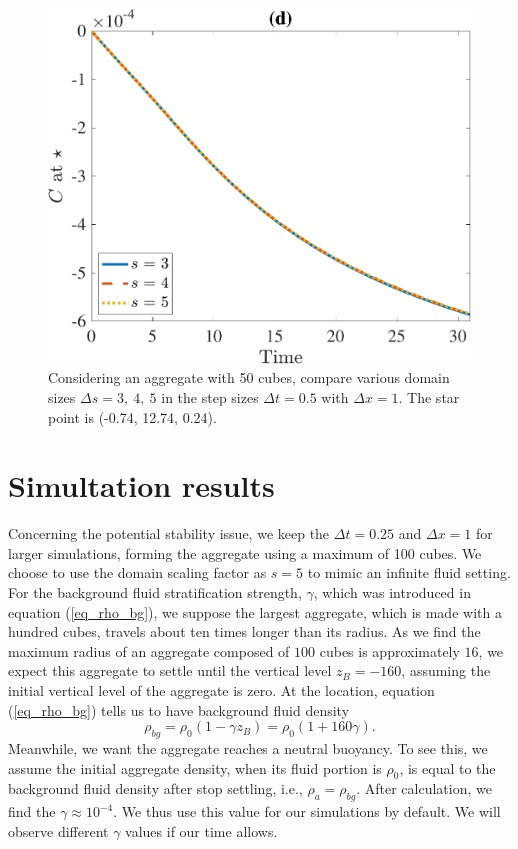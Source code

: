\begin{figure}[ht]
\begin{center}
		\includegraphics[scale=0.2]{./figures/fig_NC50_s_C_star}
	\caption{Considering an aggregate with 50 cubes, compare various domain sizes $\Delta s = 3, \ 4, \ 5$ in the step sizes $\Delta t = 0.5$ with $\Delta x = 1$. The star point is (-0.74,  12.74,  0.24).}
	\label{fig_NC50_compare_s}
\end{center}
\end{figure}



\clearpage
\section{Simultation results}
\label{sec:stratified_results}
Concerning the potential stability issue, we keep the $\Delta t = 0.25$ and $\Delta x =1$ for larger simulations, forming the aggregate using a maximum of 100 cubes. We choose to use the domain scaling factor as $s = 5$ to mimic an infinite fluid setting. For the background fluid stratification strength, $\gamma$, which was introduced in equation (\ref{eq_rho_bg}), we suppose the largest aggregate, which is made with a hundred cubes, travels about ten times longer than its radius. As we find the maximum radius of an aggregate composed of $100$ cubes is approximately $16$, we expect this aggregate to settle until the vertical level $z_B = -160$, assuming the initial vertical level of the aggregate is zero. At the location, equation (\ref{eq_rho_bg}) tells us to have background fluid density 
\[
\rho_{bg} = \rho_0 (1-\gamma z_B) =	\rho_0 (1+160\gamma).
\]
Meanwhile, we want the aggregate reaches a neutral buoyancy. To see this, we assume the initial aggregate density, when its fluid portion is $\rho_0$, is equal to the background fluid density after stop settling, i.e., $\rho_a = \rho_{bg}$. After calculation, we find the $\gamma \approx 10^{-4}$. We thus use this value for our simulations by default. We will observe different $\gamma$ values if our time allows. 


